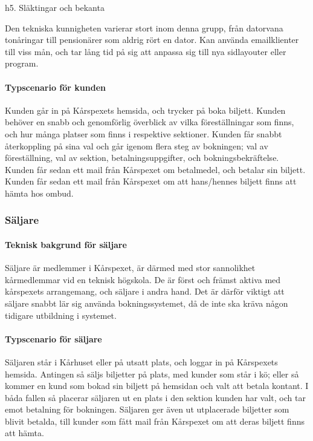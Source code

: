 \documentclass[a4paper, twoside, 11pt, titlepage]{article}
\begin{document}
			h5. Släktingar och bekanta

			Den tekniska kunnigheten varierar stort inom denna grupp, från datorvana tonåringar till pensionärer som aldrig rört en dator. Kan använda emailklienter till viss mån, och tar lång tid på sig att anpassa sig till nya sidlayouter eller program.

			\paragraph{Typscenario för kunden}

			Kunden går in på Kårspexets hemsida, och trycker på boka biljett. Kunden behöver en snabb och genomförlig överblick av vilka föreställningar som finns, och hur många platser som finns i respektive sektioner. Kunden får snabbt återkoppling på sina val och går igenom flera steg av bokningen; val av föreställning, val av sektion, betalningsuppgifter, och bokningsbekräftelse. Kunden får sedan ett mail från Kårspexet om betalmedel, och betalar sin biljett. Kunden får sedan ett mail från Kårspexet om att hans/hennes biljett finns att hämta hos ombud.

	\subsubsection{Säljare}



			\paragraph{Teknisk bakgrund för säljare}

			Säljare är medlemmer i Kårspexet, är därmed med stor sannolikhet kårmedlemmar vid en teknisk högskola. De är först och främst aktiva med kårspexets arrangemang, och säljare i andra hand. Det är därför viktigt att säljare snabbt lär sig använda bokningssystemet, då de inte ska kräva någon tidigare utbildning i systemet.

			\paragraph{Typscenario för säljare}

			Säljaren står i Kårhuset eller på utsatt plats, och loggar in på Kårspexets hemsida. Antingen så säljs biljetter på plats, med kunder som står i kö; eller så kommer en kund som bokad sin biljett på hemsidan och valt att betala kontant. I båda fallen så placerar säljaren ut en plats i den sektion kunden har valt, och tar emot betalning för bokningen. Säljaren ger även ut utplacerade biljetter som blivit betalda, till kunder som fått mail från Kårspexet om att deras biljett finns att hämta.
\end{document}
